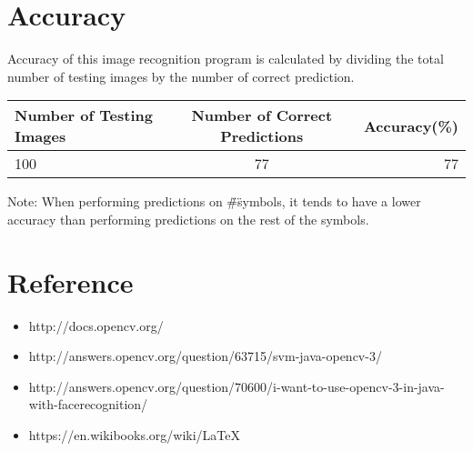 \documentclass[a4paper]{article}
\begin{document}
\section{Accuracy}

Accuracy of this image recognition program is calculated by dividing the total number of testing images by the number of correct prediction. \\

\begin{tabular}{l|c|r}
Number of Testing Images & Number of Correct Predictions & Accuracy(\%) \\ \hline
100 & 77 & 77%
\end{tabular}

Note: When performing predictions on \"\#\" symbols, it tends to have a lower accuracy than performing predictions on the rest of the symbols.

\section{Reference}
\begin{itemize}
\item http://docs.opencv.org/
\item http://answers.opencv.org/question/63715/svm-java-opencv-3/
\item http://answers.opencv.org/question/70600/i-want-to-use-opencv-3-in-java-with-facerecognition/
\item https://en.wikibooks.org/wiki/LaTeX
\end{itemize}
\end{document}
